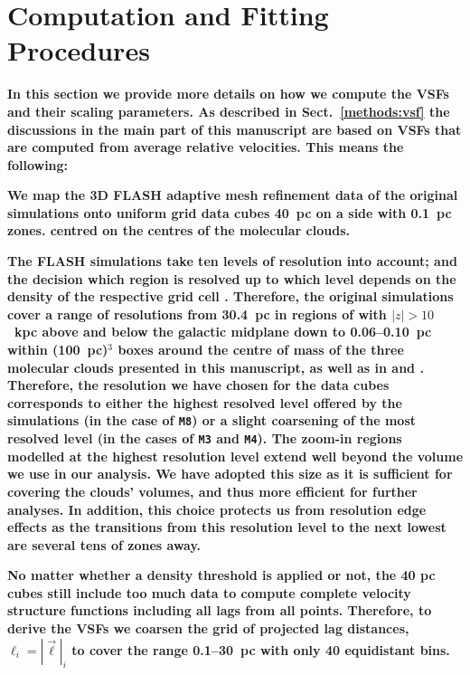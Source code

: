 \section{Computation and Fitting Procedures}\label{appFitting}

\textbf{
    In this section we provide more details on how we compute the VSFs and their scaling parameters.
    As described in Sect.~\ref{methods:vsf} the discussions in the main part of this manuscript are based on VSFs that are computed from average relative velocities. 
    This means the following:
}

\textbf{ 
    We map the 3D FLASH adaptive mesh refinement data of the original simulations  onto uniform grid data cubes 40~pc on a side with 0.1~pc zones. 
   centred on 
the centres of the molecular clouds. 
}

\textbf{
    The FLASH simulations take ten levels of resolution into account; and the decision which region is resolved up to which level depends on the density of the respective grid cell .
    Therefore, the original simulations cover a range of resolutions from 30.4~pc in regions of 
    with $|z| > 10$~kpc above and below the galactic midplane
down to 0.06--0.10~pc within (100~pc)$^3$ boxes around the centre of mass of the three molecular clouds presented in this manuscript, as well as in  and . 
    Therefore, the resolution we have chosen for the data cubes corresponds to either the highest resolved level offered by the simulations
 (in the case of \texttt{M8}) or a slight
      coarsening of the most resolved level
(in the cases of \texttt{M3} and \texttt{M4}).
The zoom-in regions modelled at the highest resolution level extend well beyond the volume we 
      use in our analysis.
 We have adopted this size as it is sufficient for covering the clouds' volumes, and thus more efficient for further analyses. In addition, this choice protects us from resolution edge effects as the transitions from this resolution level to the next lowest are several tens of zones away. 
}

\textbf{
No matter whether a density threshold is applied or not, 
     the 40 pc cubes still include too much data to compute complete velocity structure 
     functions including all lags from all points.
     Therefore, to derive
the VSFs we coarsen the grid of projected lag distances, $\ell_i = |\vec{\ell}|_i$
    to cover the range 0.1--30~pc with
only 40 equidistant bins. 
}

